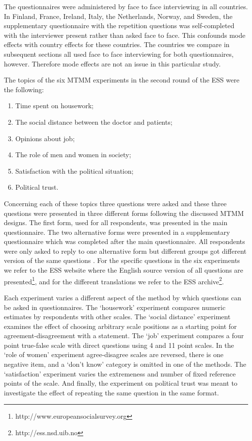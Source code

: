 \documentclass[a4paper,12pt]{article}
\begin{document}
The questionnaires were administered by face to face interviewing in all countries. In Finland, France, Ireland, Italy, the Netherlands, Norway, and Sweden, the supplementary questionnaire with the repetition questions was self-completed with the interviewer present rather than asked face to face. This confounds mode effects with country effects for these countries. The countries we compare in subsequent sections all used face to face interviewing for both questionnaires, however. Therefore mode effects are not an issue in this particular study.

The topics of the six MTMM experiments in the second round of the ESS were the following:
\begin{enumerate}
\item Time spent on housework;
\item The social distance between the doctor and patients;
\item Opinions about job;
\item The role of men and women in society;
\item Satisfaction with the political situation;
\item Political trust.
\end{enumerate}
Concerning each of these topics three questions were asked and these three questions were presented in three different forms following the discussed MTMM designs. The first form,  used for all respondents, was presented in the main questionnaire. The two alternative forms were presented in a supplementary questionnaire which was completed after the main questionnaire. All respondents were only asked to reply to one alternative form but different groups got different version of the same questions \citep*{saris_new_2004}. For the specific questions in the six experiments we refer to the ESS website where the English source version of all questions are presented\footnote{http://www.europeansocialsurvey.org}, and for the different translations we refer to the ESS archive\footnote{http://ess.nsd.uib.no}.

	Each experiment varies a different aspect of the method by which questions can be asked in questionnaires. The `housework' experiment compares numeric estimates by respondents with other scales. The `social distance' experiment examines the effect of choosing arbitrary scale positions as a starting point for agreement-disagreement with a statement. The `job' experiment compares a four point true-false scale with direct questions using 4 and 11 point scales. In the `role of women' experiment agree-disagree scales are reversed, there is one negative item, and a `don't know' category is omitted in one of the methods.  The `satisfaction' experiment varies the extremeness and number of fixed reference points of the scale. And finally, the experiment on political trust was meant to investigate the effect of repeating the same question in the same format.
\end{document}
